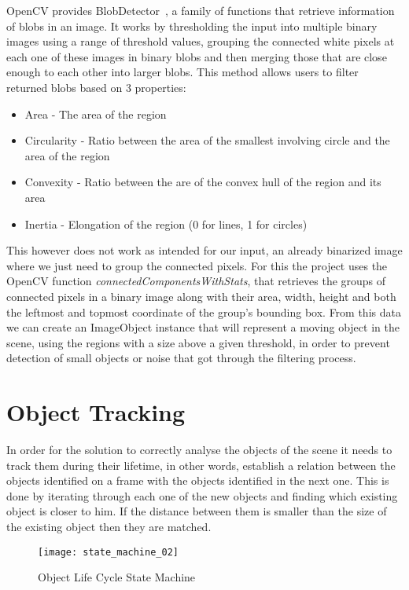 OpenCV provides BlobDetector~\cite{opencv_opencv:_2017},  a family of functions that retrieve information of blobs in an image. It works by thresholding the input into multiple binary images using a range of threshold values, grouping the connected white pixels at each one of these images in binary blobs and then merging those that are close enough to each other into larger blobs. This method allows users to filter returned blobs based on 3 properties:

\begin{itemize}
	\item Area - The area of the region
	\item Circularity - Ratio between the area of the smallest involving circle and the area of the region
	\item Convexity - Ratio between the are of the convex hull of the region and its area
	\item Inertia - Elongation of the region (0 for lines, 1 for circles)
\end{itemize}

This however does not work as intended for our input, an already binarized image where we just need to group the connected pixels. For this the project uses the OpenCV function \textit{connectedComponentsWithStats}, that retrieves the groups of connected pixels in a binary image along with their area, width, height and both the leftmost and topmost coordinate of the group's bounding box. From this data we can create an ImageObject instance that will represent a moving object in the scene, using the regions with a size above a given threshold, in order to prevent detection of small objects or noise that got through the filtering process.

\section{Object Tracking}

In order for the solution to correctly analyse the objects of the scene it needs to track them during their lifetime, in other words, establish a relation between the objects identified on a frame with the objects identified in the next one. This is done by iterating through each one of the new objects and finding which existing object is closer to him. If the distance between them is smaller than the size of the existing object then they are matched.

\begin{figure}[h]
  \begin{center}
    \leavevmode
    \texttt{[image: state\_machine\_02]}
    \caption{Object Life Cycle State Machine}
    \label{fig:object_state_machine}
  \end{center}
\end{figure}

